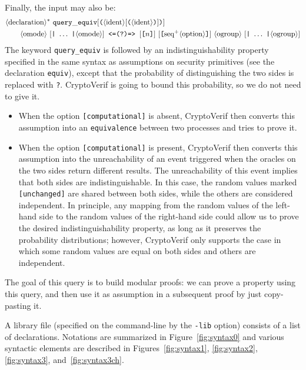 Finally, the input may also be:
\begin{align*}
&\nonterm{declaration}^*\ {\tt query\_equiv}[\texttt{(}\nonterm{ident}[\texttt{(}\nonterm{ident}\texttt{)}]\texttt{)}]\\
&\qquad \nonterm{omode}\ [\texttt{|}\ \ldots\ \texttt{|}\nonterm{omode}]\texttt{ <=(?)=> }
[\texttt{[}n\texttt{]}]\ [\texttt{[}\neseq{option}\texttt{]}]\ \nonterm{ogroup}\ [\texttt{|}\ \ldots\ \texttt{|}\nonterm{ogroup}]
\end{align*}
The keyword {\tt query\_equiv} is followed by an indistinguishability property
specified in the same syntax as assumptions on security primitives
(see the declaration \texttt{equiv}), except that the probability of
distinguishing the two sides is replaced with \texttt{?}. CryptoVerif
is going to bound this probability, so we do not need to give it.
\begin{itemize}

\item When the option \texttt{[computational]} is absent,
CryptoVerif then converts this assumption
into an \texttt{equivalence} between two processes
and tries to prove it.

\item When the option \texttt{[computational]} is present,
CryptoVerif then converts this assumption into the unreachability of
an event triggered when the oracles on the two sides return different
results. The unreachability of this event implies that both sides are
indistinguishable.  In this case, the random values
marked \texttt{[unchanged]} are shared between both sides, while the
others are considered independent. In principle, any mapping from the
random values of the left-hand side to the random values of the
right-hand side could allow us to prove the desired
indistinguishability property, as long as it preserves the probability
distributions; however, CryptoVerif only supports the case in which
some random values are equal on both sides and others are independent.

\end{itemize}
The goal of this query is to build modular proofs: we can prove
a property using this query, and then use it as assumption
in a subsequent proof by just copy-pasting it.

A library file (specified on the command-line by the
{\tt -lib} option) consists of a list of declarations.
Notations are summarized in Figure~\ref{fig:syntax0}
and various syntactic elements are described in 
Figures~\ref{fig:syntax1}, \ref{fig:syntax2}, \ref{fig:syntax3},
and~\ref{fig:syntax3ch}.


